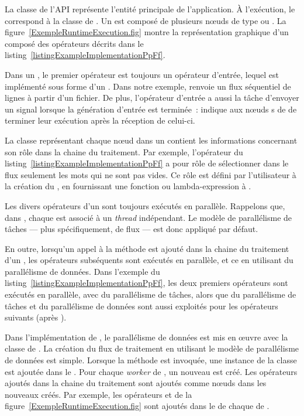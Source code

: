 La classe  de l'API repr\'esente l'entit\'e principale de l'application. \`A l'ex\'ecution, le  correspond \`a la classe  de . Un  est compos\'e de plusieurs nœuds de type  ou . La figure~\ref{ExempleRuntimeExecution.fig} montre la repr\'esentation graphique d'un  compos\'e des op\'erateurs d\'ecrits dans le listing~\ref{listingExampleImplementationPpFf}.
 
Dans un , le premier op\'erateur est toujours un op\'erateur d'entr\'ee, lequel est impl\'ement\'e sous forme d'un . Dans notre exemple,  renvoie un flux s\'equentiel de lignes \`a partir d'un fichier. De plus, l'op\'erateur d'entr\'ee a aussi la t\^ache d'envoyer un signal  lorsque la g\'en\'eration d'entr\'ee est termin\'ee~:  indique aux nœuds s de  de terminer leur ex\'ecution apr\`es la r\'eception de celui-ci.

La classe repr\'esentant chaque nœud dans un  contient les informations concernant son r\^ole dans la chaine du traitement. Par exemple, l'op\'erateur  du listing~\ref{listingExampleImplementationPpFf} a pour r\^ole de s\'electionner dans le flux seulement les mots qui ne sont pas vides. Ce r\^ole est d\'efini par l'utilisateur \`a la cr\'eation du , en fournissant une fonction ou lambda-expression \`a .


Les divers op\'erateurs d'un  sont toujours ex\'ecut\'es en parall\`ele.  Rappelons que, dans , chaque  est associ\'e \`a un \emph{thread} ind\'ependant. Le mod\`ele de parall\'elisme de t\^aches --- plus sp\'ecifiquement, de flux --- est donc appliqu\'e par d\'efaut. 

En outre, lorsqu'un appel \`a la m\'ethode  est ajout\'e dans la chaine du traitement d'un , les op\'erateurs subs\'equents sont ex\'ecut\'es en parall\`ele, et ce en utilisant du parall\'elisme de donn\'ees. Dans l'exemple du listing~\ref{listingExampleImplementationPpFf}, les deux premiers op\'erateurs sont ex\'ecut\'es en parall\`ele, avec du parall\'elisme de t\^aches, alors que du parall\'elisme de t\^aches et du parall\'elisme de donn\'ees sont aussi exploit\'es pour les op\'erateurs suivants (apr\`es ). 

Dans l'impl\'ementation de , le parall\'elisme de donn\'ees est mis en œuvre avec la classe  de . La cr\'eation du flux de traitement en utilisant le mod\`ele de parall\'elisme de donn\'ees est simple. Lorsque la m\'ethode  est invoqu\'ee, une instance de la classe  est ajout\'ee dans le . Pour chaque \emph{worker} de , un nouveau  est cr\'e\'e. Les op\'erateurs ajout\'es dans la chaine du traitement  sont ajout\'es comme nœuds dans les nouveaux  cr\'e\'es. Par exemple, les op\'erateurs  et  de la figure~\ref{ExempleRuntimeExecution.fig} sont ajout\'es dans le  de chaque  de . 


